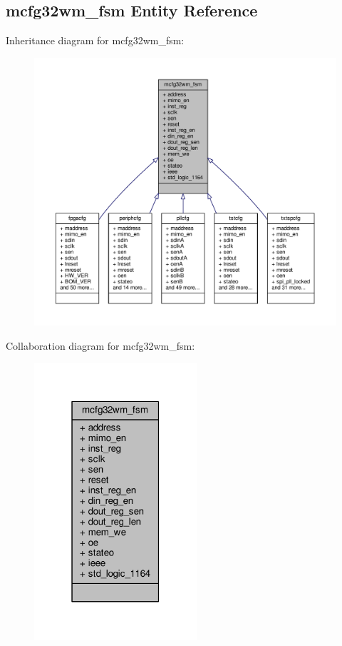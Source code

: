 \subsection{mcfg32wm\+\_\+fsm Entity Reference}
\label{classmcfg32wm__fsm}


Inheritance diagram for mcfg32wm\+\_\+fsm\+:\nopagebreak
\begin{figure}[H]
\begin{center}
\leavevmode
\includegraphics[width=350pt]{d1/d71/classmcfg32wm__fsm__inherit__graph}
\end{center}
\end{figure}


Collaboration diagram for mcfg32wm\+\_\+fsm\+:\nopagebreak
\begin{figure}[H]
\begin{center}
\leavevmode
\includegraphics[width=171pt]{d7/dbc/classmcfg32wm__fsm__coll__graph}
\end{center}
\end{figure}
